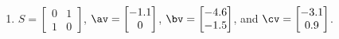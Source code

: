 \begin{exercise}
\begin{enumerate}
\item \(S=\begin{bmatrix} 0&1\\1&0 \end{bmatrix}\), 
\(\av=\begin{bmatrix} -1.1\\0 \end{bmatrix}\),
\(\bv=\begin{bmatrix} -4.6\\-1.5 \end{bmatrix}\), and
\(\cv=\begin{bmatrix} -3.1\\0.9 \end{bmatrix}\).

\end{enumerate}
\end{exercise}





